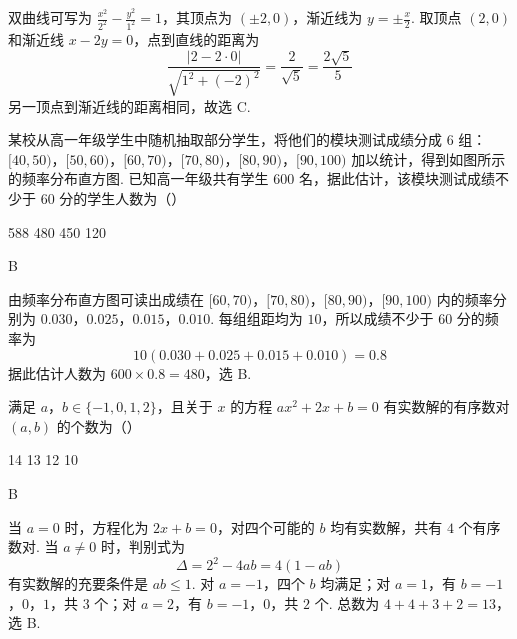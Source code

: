 \begin{solution}
双曲线可写为 \(\frac{x^2}{2^2}-\frac{y^2}{1^2}=1\)，其顶点为 \((\pm2,0)\)，渐近线为 \(y=\pm\frac{x}{2}\). 取顶点 \((2,0)\) 和渐近线 \(x-2y=0\)，点到直线的距离为
\[
\frac{|2-2\cdot0|}{\sqrt{1^2+(-2)^2}}=\frac{2}{\sqrt5}=\frac{2\sqrt5}{5}
\]
另一顶点到渐近线的距离相同，故选 C.
\end{solution}

\begin{problem}
某校从高一年级学生中随机抽取部分学生，将他们的模块测试成绩分成 \(6\) 组：\([40,50)\)，\([50,60)\)，\([60,70)\)，\([70,80)\)，\([80,90)\)，\([90,100)\) 加以统计，得到如图所示的频率分布直方图. 已知高一年级共有学生 \(600\) 名，据此估计，该模块测试成绩不少于 \(60\) 分的学生人数为（\quad）


\choices
    {588}
    {480}
    {450}
    {120}
\end{problem}

\begin{answer}
B
\end{answer}

\begin{solution}
由频率分布直方图可读出成绩在 \([60,70)\)，\([70,80)\)，\([80,90)\)，\([90,100)\) 内的频率分别为 \(0.030\)，\(0.025\)，\(0.015\)，\(0.010\). 每组组距均为 \(10\)，所以成绩不少于 \(60\) 分的频率为
\[
10(0.030+0.025+0.015+0.010)=0.8
\]
据此估计人数为 \(600\times0.8=480\)，选 B.
\end{solution}

\begin{problem}
满足 \(a\)，\(b \in \{-1, 0, 1, 2\}\)，且关于 \(x\) 的方程 \(ax^{2} + 2x + b = 0\) 有实数解的有序数对 \((a, b)\) 的个数为（\quad）

\choices
    {14}
    {13}
    {12}
    {10}
\end{problem}

\begin{answer}
B
\end{answer}

\begin{solution}
当 \(a=0\) 时，方程化为 \(2x+b=0\)，对四个可能的 \(b\) 均有实数解，共有 \(4\) 个有序数对. 当 \(a\ne0\) 时，判别式为
\[
\Delta=2^2-4ab=4(1-ab)
\]
有实数解的充要条件是 \(ab\leqslant1\). 对 \(a=-1\)，四个 \(b\) 均满足；对 \(a=1\)，有 \(b=-1\)，\(0\)，\(1\)，共 \(3\) 个；对 \(a=2\)，有 \(b=-1\)，\(0\)，共 \(2\) 个. 总数为 \(4+4+3+2=13\)，选 B.
\end{solution}

